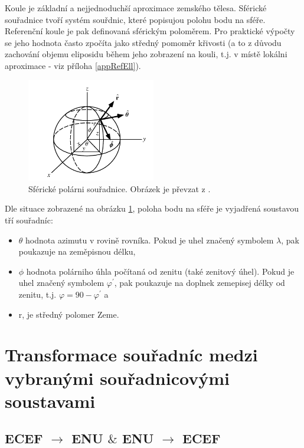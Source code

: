 \documentclass[11pt,a4paper]{article}
\begin{document}
Koule je základní a nejjednoduchší aproximace zemského tělesa. Sférické souřadnice tvoří systém souřdnic, které popisujou polohu bodu na sféře. Referenční koule je pak definovaná sférickým poloměrem. Pro praktické výpočty se jeho hodnota často zpočíta jako středný pomoměr křivosti (a to z důvodu zachování objemu eliposidu během jeho zobrazení na kouli, t.j. v místě lokálni aproximace - viz příloha \ref{appRefEll}).
 
\begin{figure}[ht!]
\begin{center}
\includegraphics[width=0.50\textwidth]{FIG/sphere_wolf}
\caption{Sférické polárni souřadnice. Obrázek je převzat z \cite{sphereWolf}.}
\label{fig:sphere}
\end{center}
\end{figure}

Dle situace zobrazené na obrázku \ref{fig:sphere}, poloha bodu na sféře je vyjadřená soustavou tří souřadníc:
\begin{itemize}
\item $\theta$ hodnota azimutu v rovině rovníka. Pokud je uhel značený symbolem $\lambda$, pak poukazuje na zeměpisnou délku,
\item $\phi$ hodnota polárniho úhla počítaná od zenitu (také zenitový úhel). Pokud je uhel značený symbolem $\varphi^{'}$, pak poukazuje na doplnek zemepisej délky od zenitu, t.j. $\varphi = 90 - \varphi^{'}$ a
\item r, je středný polomer Zeme.
\end{itemize}

\section{Transformace souřadníc medzi vybranými souřadnicovými soustavami}

\subsection{ECEF $\rightarrow$ ENU $\&$ ENU $\rightarrow$ ECEF}
\end{document}
